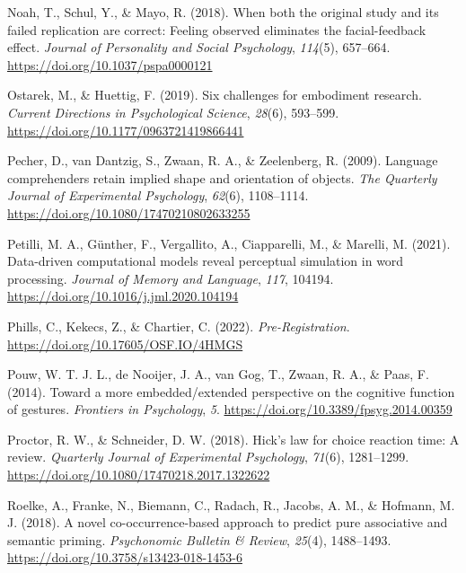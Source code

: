 \documentclass[
  man,floatsintext]{apa7}
\newlength{\cslhangindent}
\newlength{\cslentryspacingunit} %
\newenvironment{CSLReferences}[2] %
 {%
  \setlength{\parindent}{0pt}
  \ifodd #1
  \let\oldpar\par
  \def\par{\hangindent=\cslhangindent\oldpar}
  \fi
  \setlength{\parskip}{#2\cslentryspacingunit}
 }%
 {}
\begin{document}
\begin{CSLReferences}{1}{0}
\leavevmode{}%
Noah, T., Schul, Y., \& Mayo, R. (2018). When both the original study and its failed replication are correct: Feeling observed eliminates the facial-feedback effect. \emph{Journal of Personality and Social Psychology}, \emph{114}(5), 657--664. \url{https://doi.org/10.1037/pspa0000121}

\leavevmode{}%
Ostarek, M., \& Huettig, F. (2019). Six challenges for {embodiment research}. \emph{Current Directions in Psychological Science}, \emph{28}(6), 593--599. \url{https://doi.org/10.1177/0963721419866441}

\leavevmode{}%
Pecher, D., van Dantzig, S., Zwaan, R. A., \& Zeelenberg, R. (2009). Language comprehenders retain implied shape and orientation of objects. \emph{The Quarterly Journal of Experimental Psychology}, \emph{62}(6), 1108--1114. \url{https://doi.org/10.1080/17470210802633255}

\leavevmode{}%
Petilli, M. A., Günther, F., Vergallito, A., Ciapparelli, M., \& Marelli, M. (2021). Data-driven computational models reveal perceptual simulation in word processing. \emph{Journal of Memory and Language}, \emph{117}, 104194. \url{https://doi.org/10.1016/j.jml.2020.104194}

\leavevmode{}%
Phills, C., Kekecs, Z., \& Chartier, C. (2022). \emph{Pre-{Registration}}. \url{https://doi.org/10.17605/OSF.IO/4HMGS}

\leavevmode{}%
Pouw, W. T. J. L., de Nooijer, J. A., van Gog, T., Zwaan, R. A., \& Paas, F. (2014). Toward a more embedded/extended perspective on the cognitive function of gestures. \emph{Frontiers in Psychology}, \emph{5}. \url{https://doi.org/10.3389/fpsyg.2014.00359}

\leavevmode{}%
Proctor, R. W., \& Schneider, D. W. (2018). Hick's law for choice reaction time: {A} review. \emph{Quarterly Journal of Experimental Psychology}, \emph{71}(6), 1281--1299. \url{https://doi.org/10.1080/17470218.2017.1322622}

\leavevmode{}%
Roelke, A., Franke, N., Biemann, C., Radach, R., Jacobs, A. M., \& Hofmann, M. J. (2018). A novel co-occurrence-based approach to predict pure associative and semantic priming. \emph{Psychonomic Bulletin \& Review}, \emph{25}(4), 1488--1493. \url{https://doi.org/10.3758/s13423-018-1453-6}


\end{CSLReferences}
\end{document}
